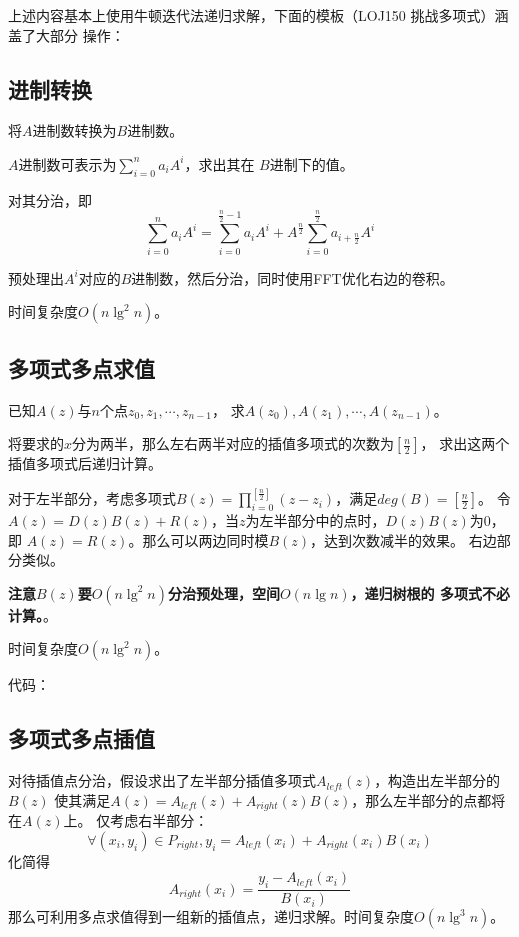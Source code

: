 上述内容基本上使用牛顿迭代法递归求解，下面的模板（LOJ150 挑战多项式）涵盖了大部分
操作：


\subsection{进制转换}
将$A$进制数转换为$B$进制数。

$A$进制数可表示为$\displaystyle \sum_{i=0}^n{a_iA^i}$，求出其在
$B$进制下的值。

对其分治，即
\begin{displaymath}
    \sum_{i=0}^n{a_iA^i}=\sum_{i=0}^{\frac{n}{2}-1}{a_iA^i}
    +A^{\frac{n}{2}}\sum_{i=0}^{\frac{n}{2}}{a_{i+\frac{n}{2}}A^i}
\end{displaymath}

预处理出$A^i$对应的$B$进制数，然后分治，同时使用FFT优化右边的卷积。

时间复杂度$O(n \lg^2 n)$。

\subsection{多项式多点求值}
已知$A(z)$与$n$个点$z_0,z_1,\cdots,z_{n-1}$，
求$A(z_0),A(z_1),\cdots,A(z_{n-1})$。

将要求的$x$分为两半，那么左右两半对应的插值多项式的次数为$[\frac{n}{2}]$，
求出这两个插值多项式后递归计算。

对于左半部分，考虑多项式$\displaystyle B(z)=\prod_{i=0}^
{[\frac{n}{2}]}(z-z_i)$，满足$deg(B)=[\frac{n}{2}]$。
令$A(z)=D(z)B(z)+R(z)$，当$z$为左半部分中的点时，$D(z)B(z)$为0，即
$A(z)=R(z)$。那么可以两边同时模$B(z)$，达到次数减半的效果。
右边部分类似。

{\bfseries 注意$B(z)$要$O(n\lg^2 n)$分治预处理，空间$O(n\lg n)$，递归树根的
多项式不必计算。}。

时间复杂度$O(n\lg^2n)$。

代码：

\subsection{多项式多点插值}

对待插值点分治，假设求出了左半部分插值多项式$A_{left}(z)$，构造出左半部分的$B(z)$
使其满足$A(z)=A_{left}(z)+A_{right}(z)B(z)$，那么左半部分的点都将在$A(z)$上。
仅考虑右半部分：
\begin{displaymath}
    \forall(x_i,y_i)\in P_{right},y_i=A_{left}(x_i)+A_{right}(x_i)B(x_i)
\end{displaymath}
化简得
\begin{displaymath}
    A_{right}(x_i)=\frac{y_i-A_{left}(x_i)}{B(x_i)}
\end{displaymath}
那么可利用多点求值得到一组新的插值点，递归求解。时间复杂度$O(n \lg^3 n)$。

